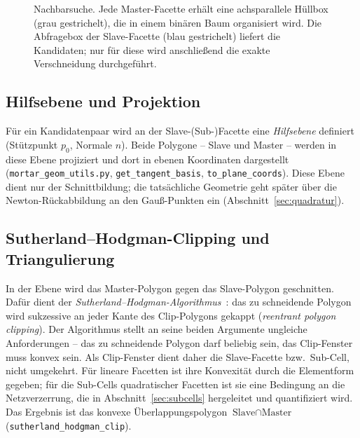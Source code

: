 \documentclass[a4paper,11pt]{article}
\def\bm#1{#1}%
\newcommand{\code}[1]{\texttt{\small #1}}
\newcommand{\file}[1]{\texttt{\small #1}}
\begin{document}
\begin{figure}[htbp]
\centering
{}
\caption[Nachbarsuche mit achsparallelen Hüllboxen]{Nachbarsuche. Jede Master-Facette erhält eine
achsparallele Hüllbox (grau gestrichelt), die in einem binären Baum organisiert wird. Die
Abfragebox der Slave-Facette (blau gestrichelt) liefert die Kandidaten; nur für diese wird
anschließend die exakte Verschneidung durchgeführt.}
\label{fig:bvh}
\end{figure}

\subsection{Hilfsebene und Projektion}
Für ein Kandidatenpaar wird an der Slave-(Sub-)Facette eine \emph{Hilfsebene} definiert (Stützpunkt
$\bm p_0$, Normale $\bm n$). Beide Polygone -- Slave und Master -- werden in diese Ebene projiziert
und dort in ebenen Koordinaten dargestellt (\file{mortar\_geom\_utils.py}, \code{get\_tangent\_basis},
\code{to\_plane\_coords}). Diese Ebene dient nur der Schnittbildung; die tatsächliche Geometrie geht
später über die Newton-Rückabbildung an den Gauß-Punkten ein (Abschnitt~\ref{sec:quadratur}).

\subsection{Sutherland--Hodgman-Clipping und Triangulierung}
In der Ebene wird das Master-Polygon gegen das Slave-Polygon geschnitten. Dafür dient der
\emph{Sutherland--Hodgman-Algorithmus}~\citep{sutherland1974}: das zu schneidende Polygon wird
sukzessive an jeder Kante des Clip-Polygons gekappt (\emph{reentrant polygon clipping}). Der
Algorithmus stellt an seine beiden Argumente ungleiche Anforderungen -- das zu schneidende Polygon
darf beliebig sein, das Clip-Fenster muss konvex sein. Als Clip-Fenster dient daher die
Slave-Facette bzw.\ Sub-Cell, nicht umgekehrt. Für lineare Facetten ist ihre Konvexität durch die
Elementform gegeben; für die Sub-Cells quadratischer Facetten ist sie eine Bedingung an die
Netzverzerrung, die in Abschnitt~\ref{sec:subcells} hergeleitet und quantifiziert wird. Das
Ergebnis ist das konvexe Überlappungspolygon $\text{Slave}\cap\text{Master}$
(\code{sutherland\_hodgman\_clip}).
\end{document}
